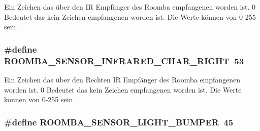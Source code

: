 Ein Zeichen das über den I\-R Empfänger des Roomba empfangenen worden ist. 0 Bedeutet das kein Zeichen empfangenen worden ist. Die Werte können von 0-\/255 sein. \hypertarget{group__roomba__sensor__extern_gaf772750454c0449f52f75c7a8b09e21e}{
\subsubsection[{R\-O\-O\-M\-B\-A\-\_\-\-S\-E\-N\-S\-O\-R\-\_\-\-I\-N\-F\-R\-A\-R\-E\-D\-\_\-\-C\-H\-A\-R\-\_\-\-R\-I\-G\-H\-T}]{\setlength{\rightskip}{0pt plus 5cm}\#define R\-O\-O\-M\-B\-A\-\_\-\-S\-E\-N\-S\-O\-R\-\_\-\-I\-N\-F\-R\-A\-R\-E\-D\-\_\-\-C\-H\-A\-R\-\_\-\-R\-I\-G\-H\-T~53}}\label{group__roomba__sensor__extern_gaf772750454c0449f52f75c7a8b09e21e}
Ein Zeichen das über den Rechten I\-R Empfänger des Roomba empfangenen worden ist. 0 Bedeutet das kein Zeichen empfangenen worden ist. Die Werte können von 0-\/255 sein. \hypertarget{group__roomba__sensor__extern_ga403c15eb2bbf6d5fda5f648427c0ac88}{
\subsubsection[{R\-O\-O\-M\-B\-A\-\_\-\-S\-E\-N\-S\-O\-R\-\_\-\-L\-I\-G\-H\-T\-\_\-\-B\-U\-M\-P\-E\-R}]{\setlength{\rightskip}{0pt plus 5cm}\#define R\-O\-O\-M\-B\-A\-\_\-\-S\-E\-N\-S\-O\-R\-\_\-\-L\-I\-G\-H\-T\-\_\-\-B\-U\-M\-P\-E\-R~45}}\label{group__roomba__sensor__extern_ga403c15eb2bbf6d5fda5f648427c0ac88}
